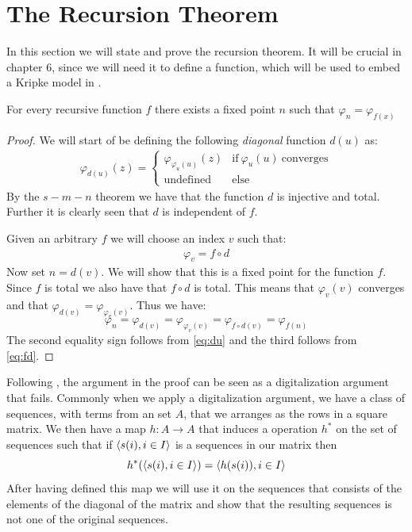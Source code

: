 \documentclass[../main.tex]{subfiles}
\begin{document}
\section{The Recursion Theorem}
In this section we will state and prove the recursion theorem. It will be
crucial in chapter 6, since we will need it to define a function, which will be
used to embed a Kripke model in \PRA.
\begin{thm}
	For every recursive function $f$ there exists a fixed point $n$ such
	that $\varphi_n=\varphi_{f(x)}$
\end{thm}
\begin{proof}
	We will start of be defining the following \textit{diagonal} function
	$d(u)$ as:
	\begin{align}
		\label{eq:du}
		\varphi_{d(u)}(z)=\begin{cases}
		\varphi_{\varphi_u(u)}(z)& \text{if}\ \varphi_u(u)\
		\text{converges}\\
		\text{undefined} & \text{else}
	\end{cases}
	\end{align}
	By the $s-m-n$ theorem we have that the function $d$ is injective and
	total. Further it is clearly seen that $d$ is independent of $f$.

	Given an arbitrary $f$ we will choose an index $v$ such that:
	\begin{align}
		\label{eq:fd}
		\varphi_v=f\circ d
	\end{align}
	Now set $n=d(v)$. We will show that this is a fixed point for the
	function $f$. Since $f$ is total we also have that $f\circ d$ is total.
	This means that $\varphi_v(v)$ converges and that
	$\varphi_{d(v)}=\varphi_{\varphi_v(v)}$. Thus we have:
	$$\varphi_n=\varphi_{d(v)}=\varphi_{\varphi_v(v)}=\varphi_{f\circ
	d(v)}=\varphi_{f(n)}$$
	The second equality sign follows from \ref{eq:du} and the third follows
	from \ref{eq:fd}.
\end{proof}
Following \parencite{Owen1973}, the argument in the proof can be seen as a
digitalization argument that fails. Commonly when we apply a digitalization
argument, we have a class of sequences, with terms from an set $A$, that we arranges as the rows in a square
matrix. We then have a map $h:A\rightarrow A$ that induces a operation $h^*$ on
the set of sequences such that if $\langle s(i),i\in I\rangle$ is a sequences in our
matrix then 
$$h^*(\langle s(i),i\in I\rangle)=\langle h(s(i)),i\in I\rangle$$
After having defined this map we will use it on the sequences that consists of
the elements of the  diagonal of the matrix and
show that the resulting sequences is not one of the original sequences. 
\end{document}
